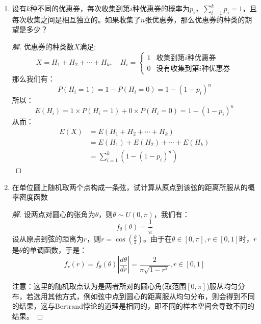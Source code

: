 \documentclass[12pt]{article}
\newcommand{\hei}{\CJKfamily{hei}}                          %
\begin{document}
\begin{enumerate}
\item {\hei 设有$k$种不同的优惠券，每次收集到第$i$种优惠券的概率为$p_i$，$\sum_{i=1}^kp_i=1$，且每次收集之间是相互独立的。如果收集了$n$张优惠券，那么优惠券的种类的期望是多少？}
\begin{proof}[解]
	优惠券的种类数$X$满足:
	\begin{equation}
	X=H_1+H_2+\cdots+H_k,\quad H_i=\left\{
	\begin{array}{cc}
	1 & \mbox{收集到第$i$种优惠券}\\
	0 & \mbox{没有收集到第$i$种优惠券}
	\end{array}
	\right.
	\end{equation}
	那么我们有：
	\begin{equation}
	P(H_i=1)=1-P(H_i=0)=1-(1-p_i)^n
	\end{equation}
	所以：
	\begin{equation}
	E(H_i)=1\times P(H_i=1)+0\times P(H_i=0)=1-(1-p_i)^n
	\end{equation}
	从而：
	\begin{equation}
	\begin{aligned}
		E(X)&=E(H_1+H_2+\cdots+H_k)\\
		&=E(H_1)+E(H_2)+\cdots+E(H_k) \\
		&=\sum_{i=1}^{k}\left(1-(1-p_i)^n\right)
	\end{aligned}
	\end{equation}
\end{proof}

\item {\hei 在单位圆上随机取两个点构成一条弦，试计算从原点到该弦的距离所服从的概率密度函数}
\begin{proof}[解]
	设两点对圆心的张角为$\theta$，则$\theta\sim U(0,\pi)$，我们有：
	\begin{equation}
	f_\theta(\theta)=\frac{1}{\pi}
	\end{equation}
	设从原点到弦的距离为$r$，则$r=\cos\left(\frac{\theta}{2}\right)$。由于在$\theta\in[0,\pi],r\in[0,1]$时，$r$是$\theta$的单调函数，于是：
	\begin{equation}
	f_r(r)=f_\theta(\theta)\left|\frac{d\theta}{dr}\right|=\frac{2}{\pi\sqrt{1-r^2}},r\in[0,1]
	\end{equation}
	
	{\hei 注意}：这里的随机取点认为是两者所对的圆心角(取范围$[0,\pi]$)服从均匀分布，若选用其他方式，例如弦中点到圆心的距离服从均匀分布，则会得到不同的结果，这与Bertrand悖论的道理是相同的，即不同的样本空间会导致不同的结果。
\end{proof}


\end{enumerate}
\end{document}
